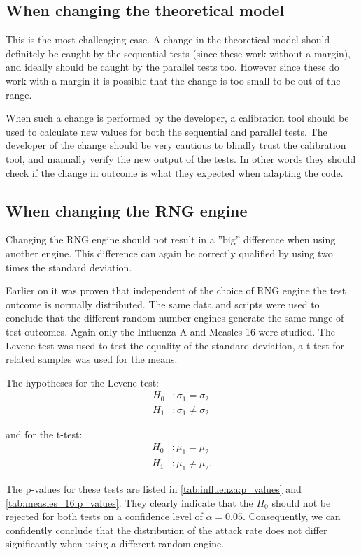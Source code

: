 \documentclass[natbib=true]{acmart}
\begin{document}
\subsection{When changing the theoretical model}

This is the most challenging case. A change in the theoretical model should definitely be caught by the sequential tests (since these work without a margin), and ideally should be caught by the parallel tests too.
However since these do work with a margin it is possible that the change is too small to be out of the range.


When such a change is performed by the developer, a calibration tool should be used to calculate new values for both the sequential and parallel tests.
The developer of the change should be very cautious to blindly trust the calibration tool, and manually verify the new output of the tests.
In other words they should check if the change in outcome is what they expected when adapting the code.

\subsection{When changing the RNG engine}

Changing the RNG engine should not result in a ''big'' difference when using another engine. This difference can again be correctly qualified by using two times the standard deviation. 

Earlier on it was proven that independent of the choice of RNG engine the test outcome is normally distributed.
The same data and scripts were used to conclude that the different random number engines generate the same range of test outcomes.
Again only the Influenza A and Measles 16 were studied. The Levene test was used to test the equality of the standard deviation, a t-test for related samples was used for the means.

The hypotheses for the Levene test:
\[
\begin{aligned}
 H_0 &: \sigma_1 = \sigma_2\\
 H_1 &: \sigma_1 \ne \sigma_2\
\end{aligned}
\]

and for the t-test:
\[
\begin{aligned}
 H_0 &: \mu_1 = \mu_2  \\
 H_1 &: \mu_1 \ne \mu_2.
\end{aligned}
\]

The p-values for these tests are listed in \cref{tab:influenza:p_values} and \cref{tab:measles_16:p_values}. They clearly indicate that the \(H_0\) should not be rejected for both tests on a confidence level of $\alpha = 0.05$. Consequently, we can confidently conclude that the distribution of the attack rate does not differ significantly when using a different random engine.
\end{document}
